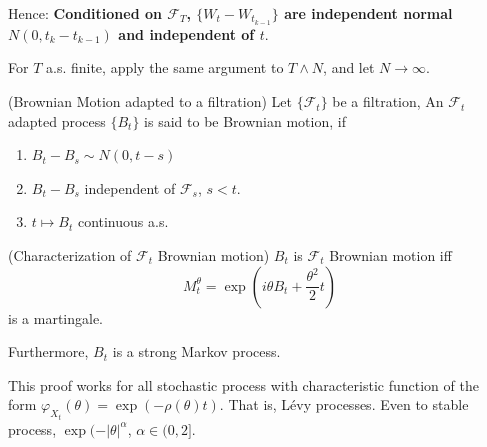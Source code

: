 Hence: \textbf{Conditioned on $\mathcal{F}_T$, $\{W_t - W_{t_{k-1}}\} $ are independent normal $N(0, t_{k} - t_{k-1})$ and independent of $t$}.


For $T$ a.s. finite, apply the same argument to $T \wedge N$, and let $N \to \infty $.

\begin{definition}
	(Brownian Motion adapted to a filtration)
	Let $\{\mathcal{F}_t\} $ be a filtration, An $\mathcal{F}_t$ adapted process $\{B_t\} $ is said to be Brownian motion, if
	\begin{enumerate}
		\item $B_t - B_s  \sim N(0, t-s)$
		\item $B_t - B_s$ independent of $\mathcal{F}_s$, $s < t$.
		\item $t \mapsto B_t$ continuous a.s.
	\end{enumerate}
\end{definition}

\begin{theorem}
	(Characterization of $\mathcal{F}_t$ Brownian motion)
	$B_t$ is $\mathcal{F}_t$ Brownian motion iff
	\[
		M_t^\theta = \exp\left( i \theta B_t + \frac{\theta^2}{2} t \right) 
	\] 
	is a martingale.

\end{theorem}

Furthermore, $B_t$ is a strong Markov process.

\begin{remark}
	This proof works for all stochastic process with characteristic function of the form $\varphi_{X_t}(\theta) = \exp(- \rho(\theta) t)$. That is, L\'evy processes. Even to stable process, $\exp( - |\theta|^\alpha$, $\alpha \in (0,2]$.
\end{remark}
